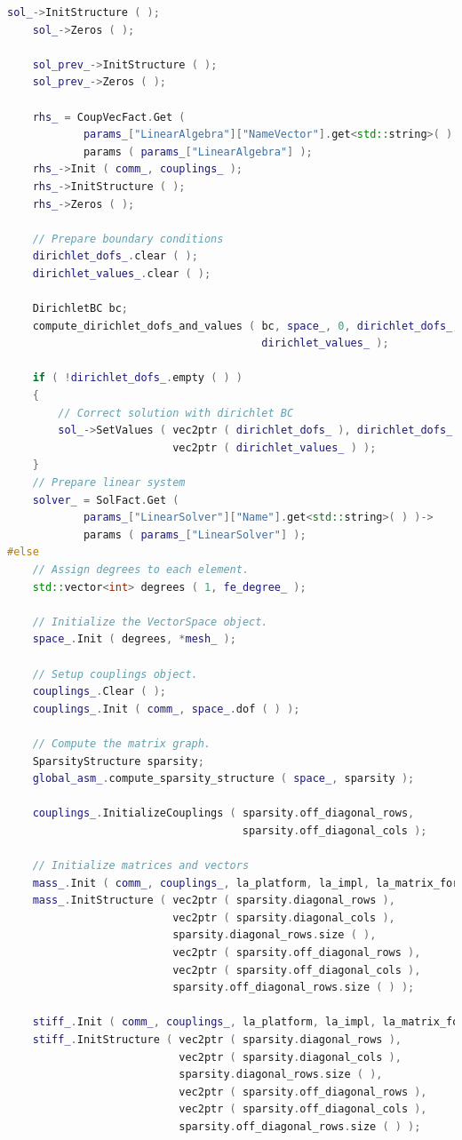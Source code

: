 \documentclass[a4paper, 11pt, twoside]{article}
\begin{document}
\begin{lstlisting}[language=C++, basicstyle={\footnotesize, \ttfamily}, keywordstyle=\color{blue}, numbers=none, tabsize=4]
    sol_->InitStructure ( );
    sol_->Zeros ( );

    sol_prev_->InitStructure ( );
    sol_prev_->Zeros ( );

    rhs_ = CoupVecFact.Get (
            params_["LinearAlgebra"]["NameVector"].get<std::string>( ) )->
            params ( params_["LinearAlgebra"] );
    rhs_->Init ( comm_, couplings_ );
    rhs_->InitStructure ( );
    rhs_->Zeros ( );

    // Prepare boundary conditions
    dirichlet_dofs_.clear ( );
    dirichlet_values_.clear ( );

    DirichletBC bc;
    compute_dirichlet_dofs_and_values ( bc, space_, 0, dirichlet_dofs_,
                                        dirichlet_values_ );

    if ( !dirichlet_dofs_.empty ( ) )
    {
        // Correct solution with dirichlet BC
        sol_->SetValues ( vec2ptr ( dirichlet_dofs_ ), dirichlet_dofs_.size ( ),
                          vec2ptr ( dirichlet_values_ ) );
    }
    // Prepare linear system
    solver_ = SolFact.Get (
            params_["LinearSolver"]["Name"].get<std::string>( ) )->
            params ( params_["LinearSolver"] );
#else
    // Assign degrees to each element.
    std::vector<int> degrees ( 1, fe_degree_ );

    // Initialize the VectorSpace object.
    space_.Init ( degrees, *mesh_ );

    // Setup couplings object.
    couplings_.Clear ( );
    couplings_.Init ( comm_, space_.dof ( ) );

    // Compute the matrix graph.
    SparsityStructure sparsity;
    global_asm_.compute_sparsity_structure ( space_, sparsity );

    couplings_.InitializeCouplings ( sparsity.off_diagonal_rows,
                                     sparsity.off_diagonal_cols );

    // Initialize matrices and vectors
    mass_.Init ( comm_, couplings_, la_platform, la_impl, la_matrix_format );
    mass_.InitStructure ( vec2ptr ( sparsity.diagonal_rows ),
                          vec2ptr ( sparsity.diagonal_cols ), 
                          sparsity.diagonal_rows.size ( ), 
                          vec2ptr ( sparsity.off_diagonal_rows ),
                          vec2ptr ( sparsity.off_diagonal_cols ), 
                          sparsity.off_diagonal_rows.size ( ) );

    stiff_.Init ( comm_, couplings_, la_platform, la_impl, la_matrix_format );
    stiff_.InitStructure ( vec2ptr ( sparsity.diagonal_rows ), 
                           vec2ptr ( sparsity.diagonal_cols ), 
                           sparsity.diagonal_rows.size ( ), 
                           vec2ptr ( sparsity.off_diagonal_rows ), 
                           vec2ptr ( sparsity.off_diagonal_cols ), 
                           sparsity.off_diagonal_rows.size ( ) );


\end{lstlisting}
\end{document}
